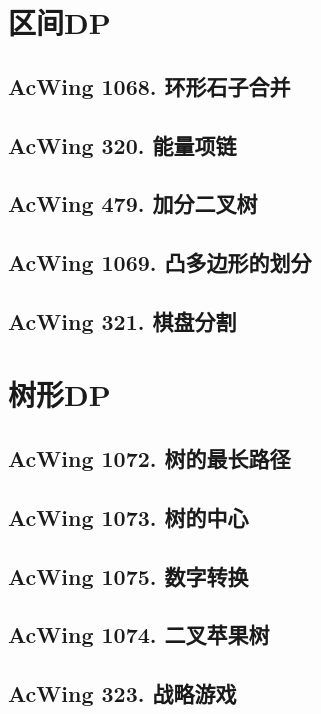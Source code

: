 \section{区间DP}

\subsection{AcWing 1068. 环形石子合并}

\subsection{AcWing 320. 能量项链}

\subsection{AcWing 479. 加分二叉树}

\subsection{AcWing 1069. 凸多边形的划分}

\subsection{AcWing 321. 棋盘分割}


\section{树形DP}

\subsection{AcWing 1072. 树的最长路径}

\subsection{AcWing 1073. 树的中心}

\subsection{AcWing 1075. 数字转换}

\subsection{AcWing 1074. 二叉苹果树}

\subsection{AcWing 323. 战略游戏}

